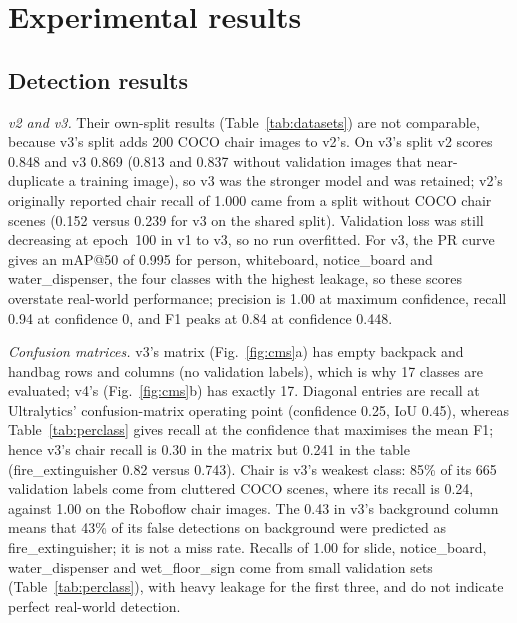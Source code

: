 \documentclass[3p,times,procedia]{elsarticle}
\DeclareRobustCommand{\rev}[1]{{\hlattr=1 #1}}
\DeclareRobustCommand{\rev}[1]{\hl{#1}}
\DeclareRobustCommand{\rev}[1]{#1}
\begin{document}
\section{Experimental results}
\label{sec:results}

\subsection{Detection results}
\label{sec:v4}

\emph{v2 and v3.} Their own-split results (Table~\ref{tab:datasets}) are
not comparable, because
v3's split adds 200 COCO chair images to v2's. \rev{On
v3's split v2 scores 0.848 and v3 0.869 (0.813 and 0.837 without validation
images that near-duplicate a training image), so v3 was the stronger model
and was retained}; \rev{v2's originally reported chair recall of 1.000 came from a
split without COCO chair scenes (0.152 versus 0.239 for v3 on the shared
split)}. \rev{Validation loss was still decreasing at epoch~100 in v1 to v3, so no
run overfitted.}
For v3, the PR curve gives an mAP@50 of 0.995 for person, whiteboard,
notice\_board and water\_dispenser, \rev{the four classes with the highest
leakage, so these scores overstate real-world performance}; precision is
1.00 at maximum confidence, recall 0.94 at confidence 0, and F1 peaks at
0.84 at confidence 0.448.

\emph{Confusion matrices.} \rev{v3's matrix (Fig.~\ref{fig:cms}a) has empty
backpack and handbag rows and columns (no validation labels), which is why
17 classes are evaluated; v4's (Fig.~\ref{fig:cms}b) has exactly 17.}
\rev{Diagonal entries are recall at Ultralytics' confusion-matrix operating point
(confidence 0.25, IoU 0.45), whereas Table~\ref{tab:perclass} gives recall at
the confidence that maximises the mean F1; hence v3's chair recall is 0.30
in the matrix but 0.241 in the table} (fire\_extinguisher 0.82 versus 0.743).
Chair is v3's weakest class: 85\% of its 665 validation labels come from
cluttered COCO scenes, where its recall is 0.24, against 1.00 on the
Roboflow chair images. The 0.43 in v3's background column means that 43\% of
its false detections on background were predicted as fire\_extinguisher; it
is not a miss rate. \rev{Recalls of 1.00 for slide, notice\_board,
water\_dispenser and wet\_floor\_sign come from small validation sets
(Table~\ref{tab:perclass}), with heavy leakage for the first three, and do
not indicate perfect real-world detection.}
\end{document}
